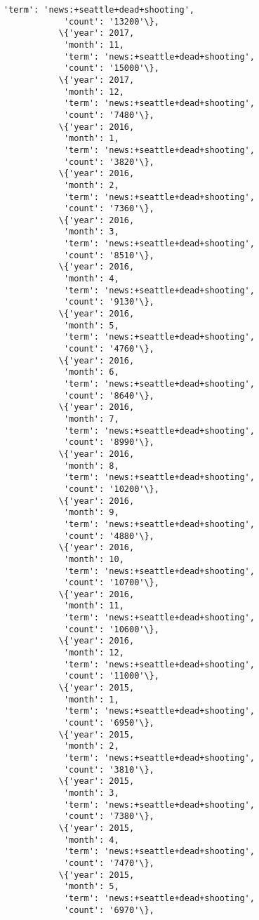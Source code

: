 \documentclass[11pt]{article}
\begin{document}
\begin{Verbatim}[commandchars=\\\{\}]
            'term': 'news:+seattle+dead+shooting',
            'count': '13200'\},
           \{'year': 2017,
            'month': 11,
            'term': 'news:+seattle+dead+shooting',
            'count': '15000'\},
           \{'year': 2017,
            'month': 12,
            'term': 'news:+seattle+dead+shooting',
            'count': '7480'\},
           \{'year': 2016,
            'month': 1,
            'term': 'news:+seattle+dead+shooting',
            'count': '3820'\},
           \{'year': 2016,
            'month': 2,
            'term': 'news:+seattle+dead+shooting',
            'count': '7360'\},
           \{'year': 2016,
            'month': 3,
            'term': 'news:+seattle+dead+shooting',
            'count': '8510'\},
           \{'year': 2016,
            'month': 4,
            'term': 'news:+seattle+dead+shooting',
            'count': '9130'\},
           \{'year': 2016,
            'month': 5,
            'term': 'news:+seattle+dead+shooting',
            'count': '4760'\},
           \{'year': 2016,
            'month': 6,
            'term': 'news:+seattle+dead+shooting',
            'count': '8640'\},
           \{'year': 2016,
            'month': 7,
            'term': 'news:+seattle+dead+shooting',
            'count': '8990'\},
           \{'year': 2016,
            'month': 8,
            'term': 'news:+seattle+dead+shooting',
            'count': '10200'\},
           \{'year': 2016,
            'month': 9,
            'term': 'news:+seattle+dead+shooting',
            'count': '4880'\},
           \{'year': 2016,
            'month': 10,
            'term': 'news:+seattle+dead+shooting',
            'count': '10700'\},
           \{'year': 2016,
            'month': 11,
            'term': 'news:+seattle+dead+shooting',
            'count': '10600'\},
           \{'year': 2016,
            'month': 12,
            'term': 'news:+seattle+dead+shooting',
            'count': '11000'\},
           \{'year': 2015,
            'month': 1,
            'term': 'news:+seattle+dead+shooting',
            'count': '6950'\},
           \{'year': 2015,
            'month': 2,
            'term': 'news:+seattle+dead+shooting',
            'count': '3810'\},
           \{'year': 2015,
            'month': 3,
            'term': 'news:+seattle+dead+shooting',
            'count': '7380'\},
           \{'year': 2015,
            'month': 4,
            'term': 'news:+seattle+dead+shooting',
            'count': '7470'\},
           \{'year': 2015,
            'month': 5,
            'term': 'news:+seattle+dead+shooting',
            'count': '6970'\},

\end{Verbatim}
\end{document}
